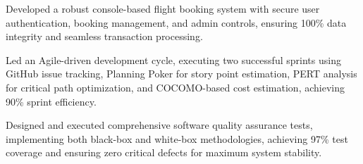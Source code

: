 \vspace{4pt}
\begin{tightemize}
    \item Developed a robust console-based flight booking system with secure user authentication, booking management, and admin controls, ensuring 100\% data integrity and seamless transaction processing.
    \item Led an Agile-driven development cycle, executing two successful sprints using GitHub issue tracking, Planning Poker for story point estimation, PERT analysis for critical path optimization, and COCOMO-based cost estimation, achieving 90\% sprint efficiency.
    \item Designed and executed comprehensive software quality assurance tests, implementing both black-box and white-box methodologies, achieving 97\% test coverage and ensuring zero critical defects for maximum system stability.
\end{tightemize}
